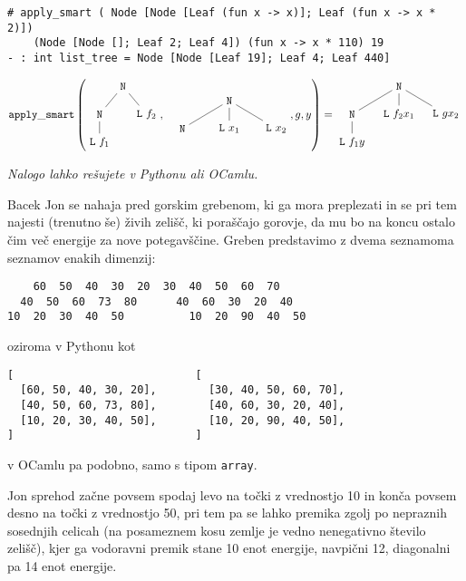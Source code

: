 \documentclass[arhiv]{../izpit}
\begin{document}
\begin{verbatim}
# apply_smart ( Node [Node [Leaf (fun x -> x)]; Leaf (fun x -> x * 2)]) 
    (Node [Node []; Leaf 2; Leaf 4]) (fun x -> x * 110) 19
- : int list_tree = Node [Node [Leaf 19]; Leaf 4; Leaf 440]
\end{verbatim}

\[
  \mathtt{apply\_smart} \left(
  \vcenter{\hbox{\begin{tikzpicture}[level distance=0.9cm]
    \node {\texttt{N}}
      child {node {\texttt{N}}
        child {node {\texttt{L} $f_1$}}
      }
      child {node {\texttt{L} $f_2$}};
  \end{tikzpicture}}}
  ,\quad
  \vcenter{\hbox{\begin{tikzpicture}[level distance=0.9cm]
    \node {\texttt{N}}
      child {node {\texttt{N}}}
      child {node {\texttt{L} $x_1$}}
      child {node {\texttt{L} $x_2$}};
  \end{tikzpicture}}}
  ,
  g
  ,
  y
  \right)
=
\vcenter{\hbox{\begin{tikzpicture}[level distance=0.9cm]
  \node {\texttt{N}}
    child {node {\texttt{N}}
      child {node {\texttt{L} $f_1 y$}}
    }
    child {node {\texttt{L} $f_2 x_1$}}
    child {node {\texttt{L} $g x_2$}};
\end{tikzpicture}}}
\]


\naloga

\emph{Nalogo lahko rešujete v Pythonu ali OCamlu.}

Bacek Jon se nahaja pred gorskim grebenom, 
ki ga mora preplezati in se pri tem najesti
(trenutno še) živih zelišč, ki poraščajo 
gorovje, da mu bo na koncu ostalo čim več energije za nove potegavščine. Greben predstavimo z dvema seznamoma seznamov enakih dimenzij:
\begin{verbatim}
    60  50  40  30  20  30  40  50  60  70
  40  50  60  73  80      40  60  30  20  40
10  20  30  40  50          10  20  90  40  50
\end{verbatim}
oziroma v Pythonu kot
\begin{verbatim}
[                            [
  [60, 50, 40, 30, 20],        [30, 40, 50, 60, 70],
  [40, 50, 60, 73, 80],        [40, 60, 30, 20, 40],
  [10, 20, 30, 40, 50],        [10, 20, 90, 40, 50],
]                            ]
\end{verbatim}
v OCamlu pa podobno, samo s tipom \verb|array|.

Jon sprehod začne povsem spodaj levo na točki z 
vrednostjo 10 in konča povsem desno na točki 
z vrednostjo 50, pri tem pa se lahko premika 
zgolj po nepraznih sosednjih celicah (na posameznem 
kosu zemlje je vedno nenegativno število zelišč), 
kjer ga vodoravni premik stane 10 enot energije, 
navpični 12, diagonalni pa 14 enot energije.
\end{document}
